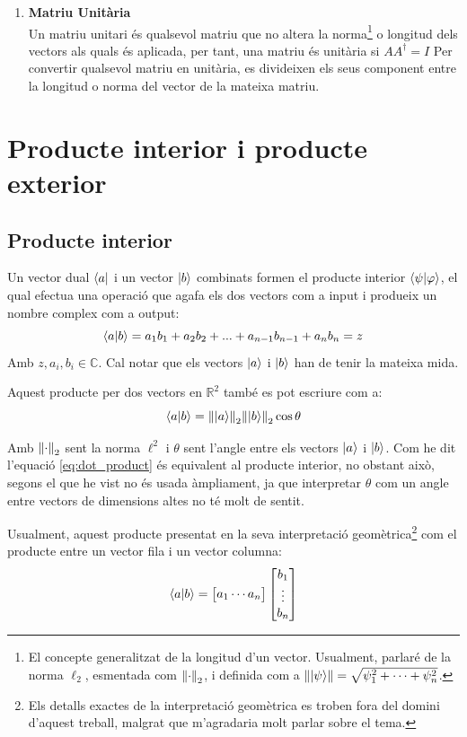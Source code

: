 \begin{enumerate}
	\item \textbf{Matriu Unitària} \\
	Un matriu unitari és qualsevol matriu que no altera la norma\footnote{El concepte generalitzat de la longitud d'un vector. Usualment, parlaré de la norma $\ell_2$, esmentada com $\norm{\cdot}_2$, i definida com a $\norm{\ket{\psi}} = \sqrt{\psi^2_1 + \cdots + \psi^2_n}$.} o longitud dels vectors als quals és aplicada, per tant, una matriu és unitària si $AA^\dagger = I$
	Per convertir qualsevol matriu en unitària, es divideixen els seus component entre la longitud o norma del vector de la mateixa matriu.
	
\end{enumerate}

\section{Producte interior i producte exterior}

\subsection{Producte interior}
Un vector dual $\bra{a}$ i un vector $\ket{b}$ combinats formen el producte interior $\bra{\psi}\ket{\varphi}$, el qual efectua una operació que agafa els dos vectors com a input i produeix un nombre complex com a output:
$$
\bra{a}\ket{b} = a_1 b_1 + a_2 b_2 + ... + a_{n-1} b_{n-1} + a_n b_n = z
$$
Amb $z, a_i, b_i \in \mathbb{C}$. Cal notar que els vectors $\ket{a}$ i $\ket{b}$ han de tenir la mateixa mida. 

Aquest producte per dos vectors en $\mathbb{R}^2$ també es pot escriure com a:
\begin{equation}
	\bra{a}\ket{b} = \norm{\ket{a}}_2  \norm{\ket{b}}_2 \cos \theta 
	\label{eq:dot_product}
\end{equation}


Amb $\norm{\cdot}_2$ sent la norma $\ell^2$ i $\theta$ sent l'angle entre els vectors $\ket{a}$ i $\ket{b}$. Com he dit l'equació \eqref{eq:dot_product} és equivalent al producte interior, no obstant això, segons el que he vist no és usada àmpliament, ja que interpretar $\theta$ com un angle entre vectors de dimensions altes no té molt de sentit. 

Usualment, aquest producte presentat en la seva interpretació geomètrica\footnote{Els detalls exactes de la interpretació geomètrica es troben fora del domini d'aquest treball, malgrat que m'agradaria molt parlar sobre el tema.} com el producte entre un vector fila i un vector columna:
$$
\bra{a}\ket{b} = \begin{bmatrix}a_1  \cdots  a_n \end{bmatrix} \begin{bmatrix} b_{1} \\ \vdots \\ b_{n} \end{bmatrix}
$$

